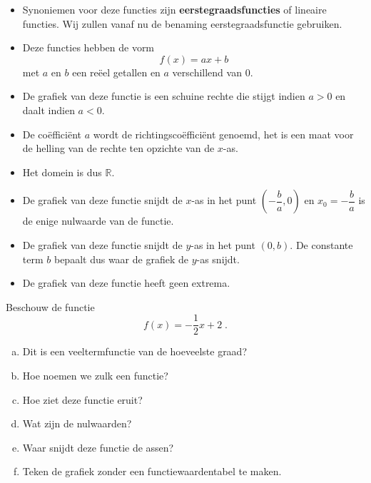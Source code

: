 \documentclass[12pt,twoside,a4paper]{article}
\begin{document}
\begin{itemize}
\item Synoniemen voor deze functies zijn {\bf eerstegraadsfuncties} of lineaire functies. Wij zullen vanaf nu de benaming eerstegraadsfunctie gebruiken.
\item Deze functies hebben de vorm
  $$f(x) = ax+b $$
  met $a$ en $b$ een reëel getallen en $a$ verschillend van $0$.
\item De grafiek van deze functie is een schuine rechte die stijgt indien $a > 0$ en daalt indien $a<0$.
\item De coëfficiënt $a$ wordt de richtingscoëfficiënt genoemd, het is een maat voor de helling van de rechte ten opzichte van de $x$-as.
\item Het domein is dus $\mathbb{R}$.
\item De grafiek van deze functie snijdt de $x$-as in het punt $(-\dfrac{b}{a}, 0)$ en $x_0=-\dfrac{b}{a}$ is de enige nulwaarde van de functie.
\item De grafiek van deze functie snijdt de $y$-as in het punt $(0, b)$. De constante term $b$ bepaalt dus waar de grafiek de $y$-as snijdt.
\item De grafiek van deze functie heeft geen extrema.
\end{itemize}

\begin{oefening}
  Beschouw de functie
  $$f(x)=-\dfrac{1}{2}x+2\;.$$
  \begin{enumerate}[(a)]
  \item Dit is een veeltermfunctie van de hoeveelste graad?
  \item Hoe noemen we zulk een functie?
  \item Hoe ziet deze functie eruit?
  \item Wat zijn de nulwaarden?
  \item Waar snijdt deze functie de assen?
  \item Teken de grafiek zonder een functiewaardentabel te maken.
  \end{enumerate}
\end{oefening}
\end{document}
